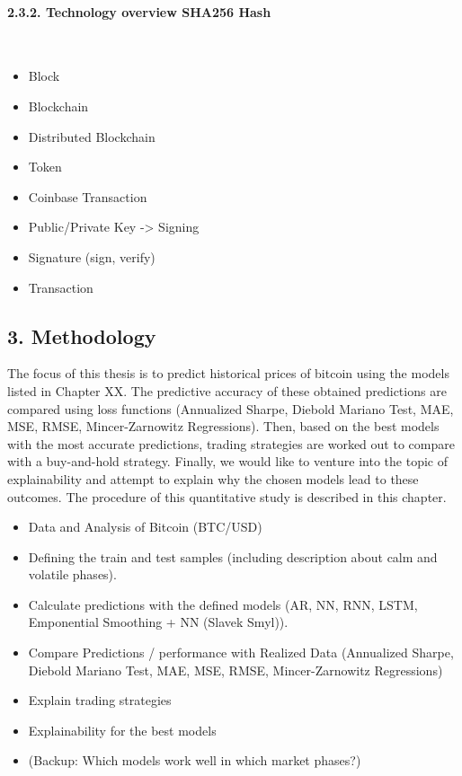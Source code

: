 \documentclass[
]{article}
\providecommand{\tightlist}{%
  \setlength{\itemsep}{0pt}\setlength{\parskip}{0pt}}
\begin{document}
\newpage

\hypertarget{technology-overview-sha256-hash}{%
\paragraph{2.3.2. Technology overview SHA256
Hash}\label{technology-overview-sha256-hash}}

~

\begin{itemize}
\tightlist
\item
  Block
\item
  Blockchain
\item
  Distributed Blockchain
\item
  Token
\item
  Coinbase Transaction
\item
  Public/Private Key -\textgreater{} Signing
\item
  Signature (sign, verify)
\item
  Transaction
\end{itemize}

\newpage

\hypertarget{methodology}{%
\subsection{3. Methodology}\label{methodology}}

The focus of this thesis is to predict historical prices of bitcoin
using the models listed in Chapter XX. The predictive accuracy of these
obtained predictions are compared using loss functions (Annualized
Sharpe, Diebold Mariano Test, MAE, MSE, RMSE, Mincer-Zarnowitz
Regressions). Then, based on the best models with the most accurate
predictions, trading strategies are worked out to compare with a
buy-and-hold strategy. Finally, we would like to venture into the topic
of explainability and attempt to explain why the chosen models lead to
these outcomes. The procedure of this quantitative study is described in
this chapter.

\begin{itemize}
\tightlist
\item
  Data and Analysis of Bitcoin (BTC/USD)
\item
  Defining the train and test samples (including description about calm
  and volatile phases).
\item
  Calculate predictions with the defined models (AR, NN, RNN, LSTM,
  Emponential Smoothing + NN (Slavek Smyl)).
\item
  Compare Predictions / performance with Realized Data (Annualized
  Sharpe, Diebold Mariano Test, MAE, MSE, RMSE, Mincer-Zarnowitz
  Regressions)
\item
  Explain trading strategies
\item
  Explainability for the best models
\item
  (Backup: Which models work well in which market phases?)
\end{itemize}
\end{document}
